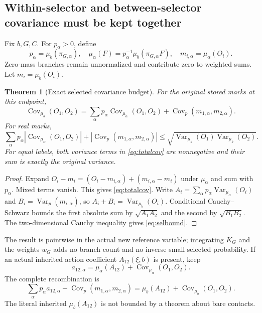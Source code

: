 \documentclass[11pt,letterpaper]{article}
\newtheorem{theorem}{Theorem}[section]
\theoremstyle{remark}\newtheorem{remark}[theorem]{Remark}
\newcommand{\Var}{\operatorname{Var}}\newcommand{\Cov}{\operatorname{Cov}}
\begin{document}
\subsection{Within-selector and between-selector covariance must be kept together}

Fix $b,G,C$. For $p_\alpha>0$, define
\[
 p_\alpha=\mu_b(\pi_{G,\alpha}),\quad
 \mu_\alpha(F)=p_\alpha^{-1}\mu_b(\pi_{G,\alpha}F),\quad
 m_{i,\alpha}=\mu_\alpha(O_i).
\]
Zero-mass branches remain unnormalized and contribute zero to weighted sums. Let $m_i=\mu_b(O_i)$.

\begin{theorem}[Exact selected covariance budget]\label{thm:selbudget}
For the original stored marks at this endpoint,
\begin{equation}\label{eq:totalcov}
 \Cov_{\mu_b}(O_1,O_2)
 =
 \sum_\alpha p_\alpha\Cov_{\mu_\alpha}(O_1,O_2)
 +\Cov_{p}(m_{1,\alpha},m_{2,\alpha}).
\end{equation}
For real marks,
\begin{equation}\label{eq:selbound}
 \sum_\alpha p_\alpha|\Cov_{\mu_\alpha}(O_1,O_2)|
 +|\Cov_p(m_{1,\alpha},m_{2,\alpha})|
 \le
 \sqrt{\Var_{\mu_b}(O_1)\Var_{\mu_b}(O_2)}.
\end{equation}
For equal labels, both variance terms in \eqref{eq:totalcov} are nonnegative and their sum is exactly the original variance.
\end{theorem}
\begin{proof}
Expand $O_i-m_i=(O_i-m_{i,\alpha})+(m_{i,\alpha}-m_i)$ under $\mu_\alpha$ and sum with $p_\alpha$. Mixed terms vanish. This gives \eqref{eq:totalcov}. Write
$A_i=\sum_\alpha p_\alpha\Var_{\mu_\alpha}(O_i)$ and
$B_i=\Var_p(m_{i,\alpha})$, so $A_i+B_i=\Var_{\mu_b}(O_i)$.
Conditional Cauchy--Schwarz bounds the first absolute sum by $\sqrt{A_1A_2}$ and the second by $\sqrt{B_1B_2}$. The two-dimensional Cauchy inequality gives \eqref{eq:selbound}.
\end{proof}

The result is pointwise in the actual new reference variable; integrating $K_G$ and the weights $w_G$ adds no branch count and no inverse small selected probability. If an actual inherited action coefficient $A_{12}(\xi,b)$ is present, keep
\[
 a_{12,\alpha}=\mu_\alpha(A_{12})+
                    \Cov_{\mu_\alpha}(O_1,O_2).
\]
The complete recombination is
\begin{equation}\label{eq:sourcecumsel}
 \sum_\alpha p_\alpha a_{12,\alpha}
 +\Cov_p(m_{1,\alpha},m_{2,\alpha})
 =\mu_b(A_{12})+\Cov_{\mu_b}(O_1,O_2).
\end{equation}
The literal inherited $\mu_b(A_{12})$ is not bounded by a theorem about bare contacts.
\end{document}
